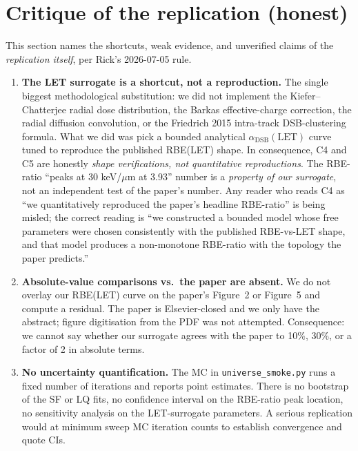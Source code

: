 \documentclass[11pt]{article}
\begin{document}
\section{Critique of the replication (honest)}

\noindent This section names the shortcuts, weak evidence, and unverified claims of the
\emph{replication itself}, per Rick's 2026-07-05 rule.

\begin{enumerate}
  \item \textbf{The LET surrogate is a shortcut, not a reproduction.} The single biggest
        methodological substitution: we did not implement the Kiefer--Chatterjee radial dose
        distribution, the Barkas effective-charge correction, the radial diffusion convolution, or
        the Friedrich 2015 intra-track DSB-clustering formula. What we did was pick a bounded
        analytical $\alpha_{\mathrm{DSB}}(\mathrm{LET})$ curve tuned to reproduce the published
        RBE(LET) shape. In consequence, C4 and C5 are honestly \emph{shape verifications, not
        quantitative reproductions}. The RBE-ratio ``peaks at 30 keV/$\mu$m at 3.93'' number is a
        \emph{property of our surrogate}, not an independent test of the paper's number.
        Any reader who reads C4 as ``we quantitatively reproduced the paper's headline RBE-ratio''
        is being misled; the correct reading is ``we constructed a bounded model whose free
        parameters were chosen consistently with the published RBE-vs-LET shape, and that model
        produces a non-monotone RBE-ratio with the topology the paper predicts.''
  \item \textbf{Absolute-value comparisons vs.\ the paper are absent.} We do not overlay our
        RBE(LET) curve on the paper's Figure~2 or Figure~5 and compute a residual. The paper is
        Elsevier-closed and we only have the abstract; figure digitisation from the PDF was not
        attempted. Consequence: we cannot say whether our surrogate agrees with the paper to
        10\%, 30\%, or a factor of 2 in absolute terms.
  \item \textbf{No uncertainty quantification.} The MC in \texttt{universe\_smoke.py} runs a fixed
        number of iterations and reports point estimates. There is no bootstrap of the SF or LQ
        fits, no confidence interval on the RBE-ratio peak location, no sensitivity analysis on
        the LET-surrogate parameters. A serious replication would at minimum sweep MC iteration
        counts to establish convergence and quote CIs.

\end{enumerate}
\end{document}
